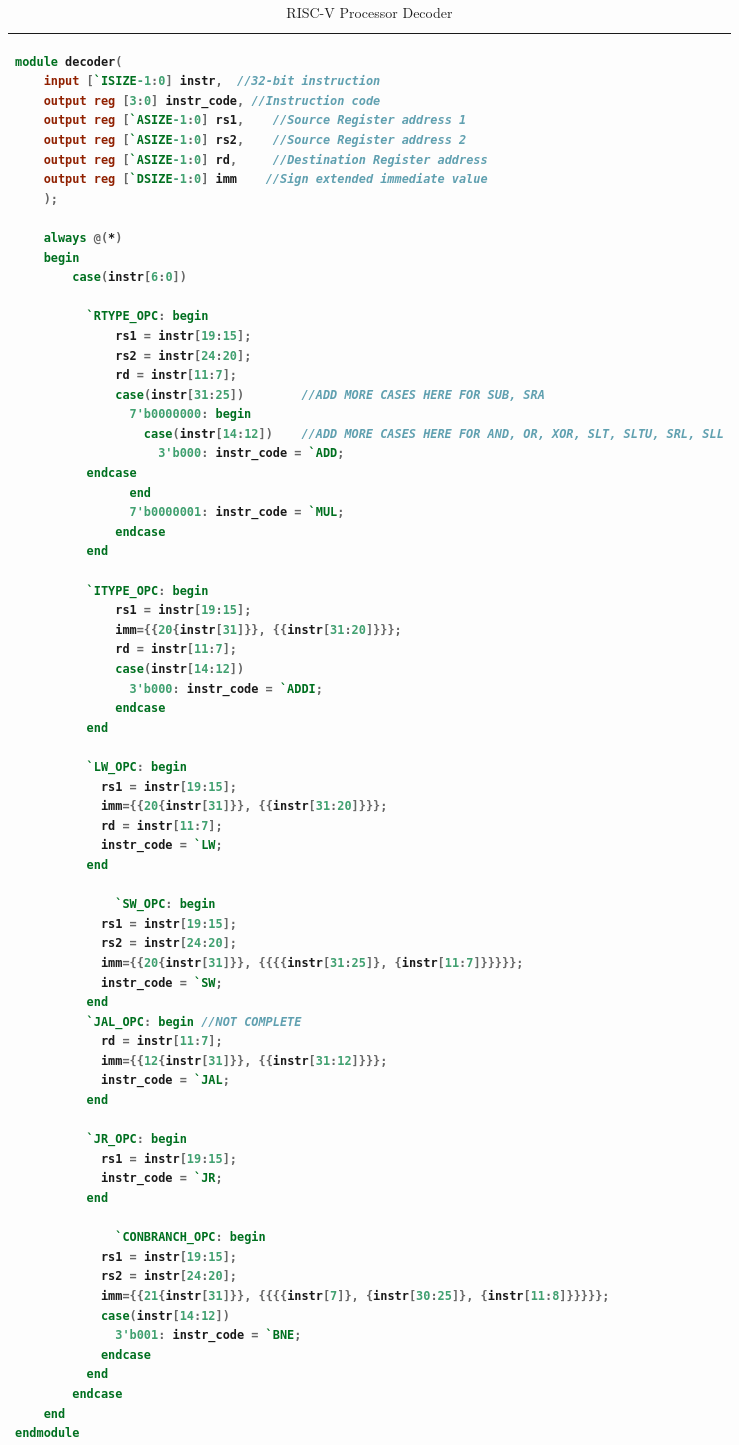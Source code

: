 \begin{table}[!h]
\centering
\caption{RISC-V Processor Decoder}
\label{riscvcode3:dec}
\begin{tabular}{l}
\toprule
\begin{lstlisting}[columns=fullflexible, language=Verilog]
module decoder(
    input [`ISIZE-1:0] instr,  //32-bit instruction	
    output reg [3:0] instr_code, //Instruction code
    output reg [`ASIZE-1:0] rs1,    //Source Register address 1
    output reg [`ASIZE-1:0] rs2,    //Source Register address 2
    output reg [`ASIZE-1:0] rd,     //Destination Register address
    output reg [`DSIZE-1:0] imm    //Sign extended immediate value
    );
 
    always @(*)
    begin        
        case(instr[6:0])

          `RTYPE_OPC: begin
              rs1 = instr[19:15];
              rs2 = instr[24:20];
              rd = instr[11:7];
              case(instr[31:25])        //ADD MORE CASES HERE FOR SUB, SRA
                7'b0000000: begin
                  case(instr[14:12])    //ADD MORE CASES HERE FOR AND, OR, XOR, SLT, SLTU, SRL, SLL
                    3'b000: instr_code = `ADD;    
		  endcase
                end
                7'b0000001: instr_code = `MUL;
              endcase
          end

          `ITYPE_OPC: begin
              rs1 = instr[19:15];
              imm={{20{instr[31]}}, {{instr[31:20]}}};
              rd = instr[11:7];
              case(instr[14:12])
                3'b000: instr_code = `ADDI;
              endcase
          end

          `LW_OPC: begin
            rs1 = instr[19:15];
            imm={{20{instr[31]}}, {{instr[31:20]}}};
            rd = instr[11:7];
            instr_code = `LW;
          end

    		  `SW_OPC: begin
            rs1 = instr[19:15];
            rs2 = instr[24:20];
            imm={{20{instr[31]}}, {{{{instr[31:25]}, {instr[11:7]}}}}};
            instr_code = `SW;
          end
          `JAL_OPC: begin //NOT COMPLETE
            rd = instr[11:7];
            imm={{12{instr[31]}}, {{instr[31:12]}}};
            instr_code = `JAL;
          end
          
          `JR_OPC: begin
            rs1 = instr[19:15];
            instr_code = `JR;
          end
          
    		  `CONBRANCH_OPC: begin
            rs1 = instr[19:15];
            rs2 = instr[24:20];
            imm={{21{instr[31]}}, {{{{instr[7]}, {instr[30:25]}, {instr[11:8]}}}}};
            case(instr[14:12])
              3'b001: instr_code = `BNE;
            endcase
          end
        endcase
    end
endmodule
\end{lstlisting}
\\
\bottomrule
\end{tabular}
\end{table}
